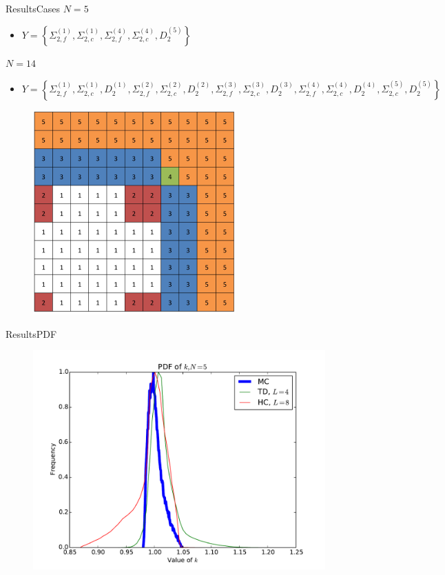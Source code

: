 \documentclass{beamer}
\begin{document}
\begin{frame}{Results}{Cases}
$N=5$
\begin{itemize}
\item $Y=\left\{\Sigma^{(1)}_{2,f},\Sigma^{(1)}_{2,c},\Sigma^{(4)}_{2,f},\Sigma^{(4)}_{2,c},D^{(5)}_2\right\}$
\end{itemize}
$N=14$
\begin{itemize}\tiny
\item $Y=\left\{\Sigma^{(1)}_{2,f},\Sigma^{(1)}_{2,c},D_2^{(1)},
\Sigma^{(2)}_{2,f},\Sigma^{(2)}_{2,c},D_2^{(2)},
\Sigma^{(3)}_{2,f},\Sigma^{(3)}_{2,c},D_2^{(3)},
\Sigma^{(4)}_{2,f},\Sigma^{(4)}_{2,c},D_2^{(4)},
\Sigma^{(5)}_{2,c},D^{(5)}_2\right\}$
\end{itemize}
\begin{figure}
  \includegraphics[width=0.4\linewidth]{../graphics/core}
\end{figure}
\end{frame}

\begin{frame}{Results}{PDF}\vspace{-30pt}
\begin{figure}
  \includegraphics[width=0.85\linewidth]{../graphics/kpdf}
\end{figure}
\end{frame}
\end{document}
